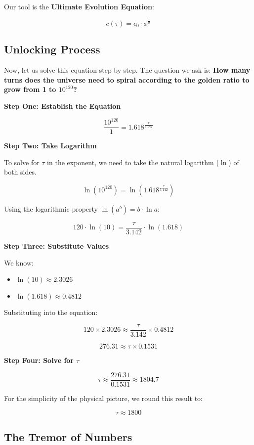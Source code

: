 Our tool is the \textbf{Ultimate Evolution Equation}:

\[c(\tau) = c_0 \cdot \phi^{\frac{\tau}{\pi}}\]

\subsection{Unlocking Process}

Now, let us solve this equation step by step. The question we ask is: \textbf{How many turns does the universe need to spiral according to the golden ratio to grow from 1 to $10^{120}$?}

\textbf{Step One: Establish the Equation}

\[\frac{10^{120}}{1} = 1.618^{\frac{\tau}{3.142}}\]

\textbf{Step Two: Take Logarithm}

To solve for $\tau$ in the exponent, we need to take the natural logarithm ($\ln$) of both sides.

\[\ln(10^{120}) = \ln\left(1.618^{\frac{\tau}{3.142}}\right)\]

Using the logarithmic property $\ln(a^b) = b \cdot \ln a$:

\[120 \cdot \ln(10) = \frac{\tau}{3.142} \cdot \ln(1.618)\]

\textbf{Step Three: Substitute Values}

We know:

\begin{itemize}
\item $\ln(10) \approx 2.3026$

\item $\ln(1.618) \approx 0.4812$
\end{itemize}

Substituting into the equation:

\[120 \times 2.3026 \approx \frac{\tau}{3.142} \times 0.4812\]

\[276.31 \approx \tau \times 0.1531\]

\textbf{Step Four: Solve for $\tau$}

\[\tau \approx \frac{276.31}{0.1531} \approx 1804.7\]

For the simplicity of the physical picture, we round this result to:

\textbf{\[\tau \approx 1800\]}

\subsection{The Tremor of Numbers}

